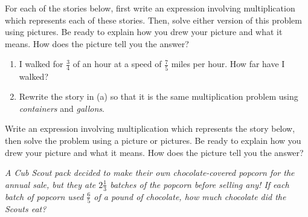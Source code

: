 \documentclass[nooutcomes,noauthor,handout]{ximera}
\begin{document}
\begin{problem}
 For each of the stories below, first write an expression involving multiplication which represents each of these stories.  Then, solve either version of this problem using pictures.  Be ready to explain how you drew your picture and what it means.  How does the picture tell you the answer? 

\begin{enumerate}
    \item I walked for  $\frac{3}{4}$ of an hour at a speed of  $\frac{7}{5}$ miles per hour.  How far have I walked?
    \item Rewrite the story in (a) so that it is the same multiplication problem using \emph{containers} and \emph{gallons}.
\end{enumerate}
\end{problem}
\vfill

\begin{problem}
 Write an expression involving multiplication which represents the story below, then solve the problem using a picture or pictures.  Be ready to explain how you drew your picture and what it means.  How does the picture tell you the answer?


\emph{A Cub Scout pack decided to make their own chocolate-covered popcorn for the annual sale, but they ate $2 \frac{1}{3}$ batches of the popcorn before selling any! If each batch of popcorn used $\frac{6}{5}$ of a pound of chocolate, how much chocolate did the Scouts eat?}

\end{problem}
\vfill
 
\end{document}
